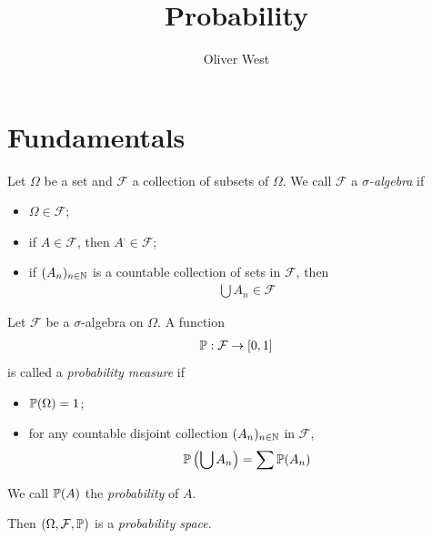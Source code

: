 \documentclass{../template/note}
\author{Oliver West}
\title{Probability}
\date{}
\begin{document}
    \maketitle

    \tableofcontents


    \section{Fundamentals}

    \begin{definition}
        Let \(\Omega\) be a set and \(\mathcal F\) a collection of subsets of \(\Omega\). We call \(\mathcal F\) a \emph{\(\sigma\)-algebra} if
        \begin{itemize}
            \item \(\Omega \in \mathcal F\);
            \item if \(A \in \mathcal F\), then \(A^\comp \in \mathcal F\);
            \item if \((A_n)_{n \in \mathbb N}\) is a countable collection of sets in \(\mathcal F\), then
            \begin{align*}
                \bigcup A_n \in \mathcal F
            \end{align*}
        \end{itemize}
    \end{definition}
    
    \begin{definition}
        Let \(\mathcal F\) be a \(\sigma\)-algebra on \(\Omega\). A function
        \begin{align*}
            \mathbb P: \mathcal F \to [0, 1]
        \end{align*}
        is called a \emph{probability measure} if
        \begin{itemize}
            \item \(\mathbb P(\Omega) = 1\);
            \item for any countable disjoint collection \((A_n)_{n \in \mathbb N}\) in \(\mathcal F\),
            \begin{align*}
                \mathbb P \left(\bigcup A_n\right) = \sum \mathbb P(A_n)
            \end{align*}
        \end{itemize}
        We call \(\mathbb P(A)\) the \emph{probability} of \(A\).
    \end{definition}
    
    Then \((\Omega, \mathcal F, \mathbb P)\) is a \emph{probability space}.
    
\end{document}
